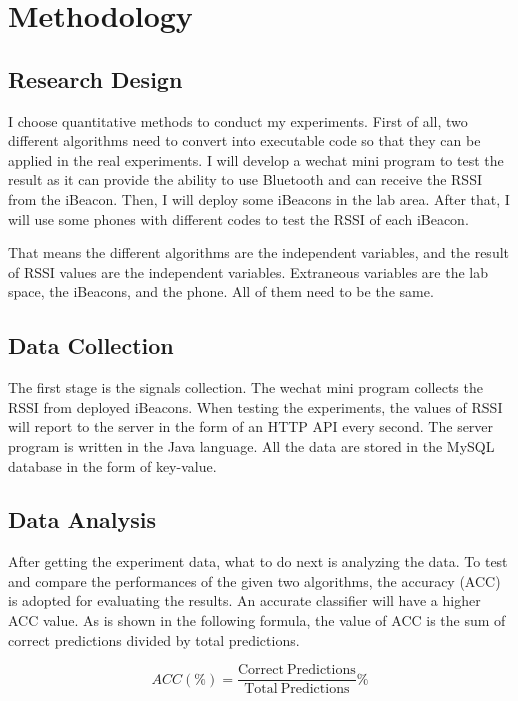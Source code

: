 \documentclass{sigchi}
\begin{document}
\section{Methodology}

\subsection{Research Design}

I choose quantitative methods to conduct my experiments. First of all, two different algorithms need to convert into executable code so that they can be applied in the real experiments. I will develop a wechat mini program to test the result as it can provide the ability to use Bluetooth and can receive the RSSI from the iBeacon. Then, I will deploy some iBeacons in the lab area. After that, I will use some phones with different codes to test the RSSI of each iBeacon.

That means the different algorithms are the independent variables, and the result of RSSI values are the independent variables. Extraneous variables are the lab space, the iBeacons, and the phone. All of them need to be the same.

\subsection{Data Collection}
The first stage is the signals collection. The wechat mini program collects the RSSI from deployed iBeacons. When testing the experiments, the values of RSSI will report to the server in the form of an HTTP API every second. The server program is written in the Java language. All the data are stored in the MySQL database in the form of key-value.

\subsection{Data Analysis}
After getting the experiment data, what to do next is analyzing the data.
To test and compare the performances of the given two algorithms, the accuracy (ACC) is adopted for evaluating the results. An accurate classifier will have a higher ACC value. As is shown in the following formula, the value of ACC is the sum of correct predictions divided by total predictions.

\begin{equation*} ACC(\%)=\frac{\text{Correct}\ \text{Predictions}}{\text{Total}\ \text{Predictions}}\% \tag{7} \end{equation*}
\end{document}
